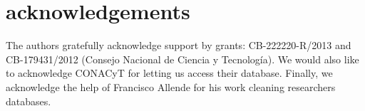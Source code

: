 \documentclass[11pt]{article}
\begin{document}
{%
%
%
%


\section{acknowledgements}
The authors gratefully acknowledge support by grants: CB-222220-R/2013 and
CB-179431/2012 (Consejo Nacional de Ciencia y Tecnolog\'ia). We would also like
to acknowledge CONACyT for letting us access their database. Finally, we
acknowledge the help of Francisco Allende for his work cleaning researchers
databases.








}
\end{document}
